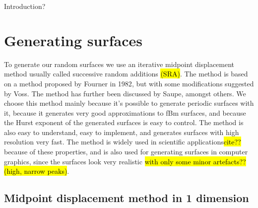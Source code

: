 Introduction?

\section{Generating surfaces}

To generate our random surfaces we use an iterative midpoint displacement method usually called successive random additions \hl{(SRA)}. The method is based on a method proposed by Fourner in 1982\cite{fournier1982computer}, but with some modifications suggested by Voss\cite{voss1985random, voss1988fractals}. The method has further been discussed by Saupe\cite{saupe1988algorithms}, amongst others. We choose this method mainly because it's possible to generate periodic surfaces with it, because it generates very good approximations to fBm surfaces\cite{zhou2005comparison}, and because the Hurst exponent of the generated surfaces is easy to control. The method is also easy to understand, easy to implement, and generates surfaces with high resolution very fast. The method is widely used in scientific applications\hl{cite??} because of these properties, and is also used for generating surfaces in computer graphics, since the surfaces look very realistic \hl{with only some minor artefacts?? (high, narrow peaks)}.

\subsection{Midpoint displacement method in 1 dimension}

